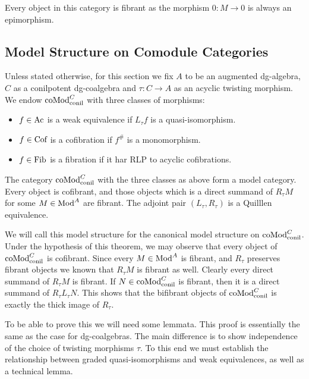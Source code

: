 \documentclass[../thesis.tex]{subfiles}
\begin{document}
            Every object in this category is fibrant as the morphism $0 : M \rightarrow 0$ is always an epimorphism.

        \subsection{Model Structure on Comodule Categories}

            Unless stated otherwise, for this section we fix $A$ to be an augmented dg-algebra, $C$ as a conilpotent dg-coalgebra and $\tau : C \rightarrow A$ as an acyclic twisting morphism. We endow $\tt{coMod}^C_{\tt{conil}}$ with three classes of morphisms:
            \begin{itemize}
                \item $f\in \tt{Ac}$ is a weak equivalence if $L_\tau f$ is a quasi-isomorphism.
                \item $f\in \tt{Cof}$ is a cofibration if $f^\#$ is a monomorphism.
                \item $f\in \tt{Fib}$ is a fibration if it har RLP to acyclic cofibrations.
            \end{itemize}

            \begin{thm}\label{thm: model-comod}
              The category $\tt{coMod}^C_{\tt{conil}}$ with the three classes as above form a model category. Every object is cofibrant, and those objects which is a direct summand of $R_\tau M$ for some $M\in \tt{Mod}^A$ are fibrant. The adjoint pair $(L_\tau, R_\tau)$ is a Quilllen equivalence.
            \end{thm}

            We will call this model structure for the canonical model structure on $\tt{coMod}^C_{\tt{conil}}$. Under the hypothesis of this theorem, we may observe that every object of $\tt{coMod}^C_{\tt{conil}}$ is cofibrant. Since every $M\in \tt{Mod}^A$ is fibrant, and $R_\tau$ preserves fibrant objects we known that $R_\tau M$ is fibrant as well. Clearly every direct summand of $R_\tau M$ is fibrant. If $N\in \tt{coMod}^C_{\tt{conil}}$ is fibrant, then it is a direct summand of $R_\tau L_\tau N$. This shows that the bifibrant objects of $\tt{coMod}^C_{\tt{conil}}$ is exactly the thick image of $R_\tau$.

            To be able to prove this we will need some lemmata. This proof is essentially the same as the case for dg-coalgebras. The main difference is to show independence of the choice of twisting morphisms $\tau$. To this end we must establish the relationship between graded quasi-isomorphisms and weak equivalences, as well as a technical lemma.
\end{document}
